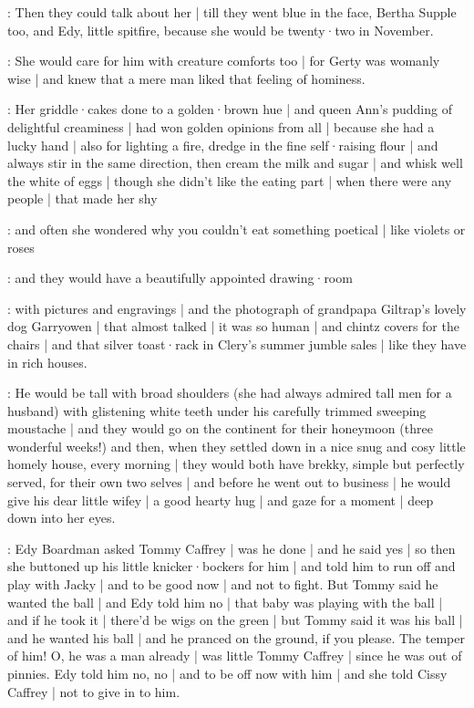 \gertyJudgy:
Then they could talk about her |
till they went blue in the face,
Bertha Supple too,
and Edy,
little spitfire,
because she would be twenty·two in November.

\gertyRomantic:
She would care for him with creature comforts too |
for Gerty was womanly wise |
and knew that a mere man liked that feeling of hominess.

\gertyReal:
Her griddle·cakes done to a golden·brown hue |
and queen Ann's pudding of delightful creaminess |
had won golden opinions from all |
because she had a lucky hand |
also for lighting a fire,
dredge in the fine self·raising flour |
and always stir in the same direction,
then cream the milk and sugar |
and whisk well the white of eggs |
though she didn't like the eating part |
when there were any people |
that made her shy

\gertyNovel:
and often
she wondered why you couldn't eat something poetical |
like violets or roses

\gertyRomantic:
and they would have a beautifully appointed drawing·room

\gertyReal:
with pictures and engravings |
and the photograph of grandpapa Giltrap's lovely dog Garryowen |
that almost talked |
it was so human |
and chintz covers for the chairs |
and that silver toast·rack in Clery's summer jumble sales |
like they have in rich houses.

\gertyNovel:
He would be tall with broad shoulders
(she had always admired tall men for a husband)
with glistening white teeth
under his carefully trimmed sweeping moustache |
and they would go on the continent
for their honeymoon
(three wonderful weeks!)
and then,
when they settled down in a nice snug and cosy little homely house,
every morning |
they would both have brekky,%
simple but perfectly served,
for their own two selves |
and before he went out to business |
he would give his dear little wifey |
a good hearty hug |
and gaze for a moment |
deep down into her eyes.

:
Edy Boardman asked Tommy Caffrey |
was he done |
and he said yes |
so then she buttoned up his little knicker·bockers for him |
and told him to run off
and play with Jacky |
and to be good now |
and not to fight.
But Tommy said he wanted the ball |
and Edy told him no |
that baby was playing with the ball |
and if he took it |
there'd be wigs on the green |
but Tommy said it was his ball |
and he wanted his ball |
and he pranced on the ground,
if you please.
The temper of him!
O, he was a man already |
was little Tommy Caffrey |
since he was out of pinnies.%
Edy told him no, no |
and to be off now with him |
and she told Cissy Caffrey |
not to give in to him.

